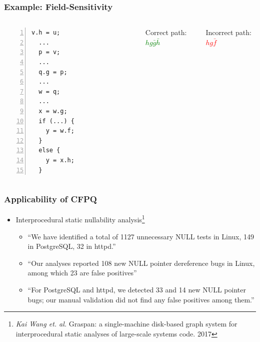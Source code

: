 \documentclass[xcolor=table]{beamer}
\begin{document}
\begin{frame}[fragile]
\frametitle{Example: Field-Sensitivity}
\begin{columns}[c] %

\begin{Verbatim}[numbers=left]
  v.h = u;
  ...
  p = v;
  ...
  q.g = p;
  ...
  w = q;
  ...
  x = w.g;
  if (...) {
    y = w.f;
  }
  else {
    y = x.h;
  }    
\end{Verbatim}

\begin{figure}[h]
    \centering        
\end{figure}
Correct path: \textcolor{green}{$hg\bar{g}\bar{h}$}

Incorrect path: \textcolor{red}{$hg\bar{f}$}

\end{columns}
\end{frame}


\begin{frame}
  \frametitle{Applicability of CFPQ}

\begin{itemize} 
\item Interprocedural static nullability analysis\footnote{\emph{Kai Wang et. al.} Graspan: a single-machine disk-based graph system for interprocedural 
static analyses of large-scale systems code. 2017}
  
\begin{itemize} 
   \item ``We have identified a total of 1127 unnecessary NULL tests in Linux, 149 in PostgreSQL, 
   32 in httpd.''
   \item ``Our analyses reported 108 new NULL pointer dereference bugs in Linux, among which 23 are false positives''
   \item ``For PostgreSQL and httpd, we detected 33 and 14 new NULL pointer bugs; our manual 
   validation did not find any false positives among them.''
\end{itemize}

\end{itemize}

\end{frame}
\end{document}
